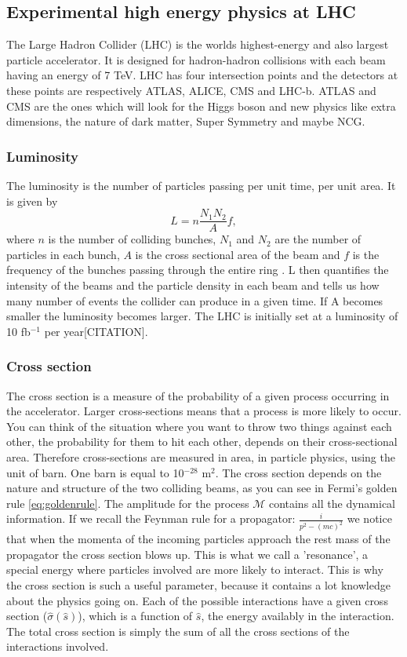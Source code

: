 \subsection{Experimental high energy physics at LHC}
The Large Hadron Collider (LHC) is the worlds highest-energy and also largest particle accelerator. It is designed for hadron-hadron collisions with each beam having an energy of 7 TeV. LHC has four intersection points and the detectors at these points are respectively ATLAS, ALICE, CMS and LHC-b. ATLAS and CMS are the ones which will look for the Higgs boson and new physics like extra dimensions, the nature of dark matter, Super Symmetry and maybe NCG. 

\subsubsection{Luminosity}
The luminosity is the number of particles passing per unit time, per unit area. It is given by
\begin{equation}
L=n\frac{N_{1}N_{2}}{A}f,
\end{equation}
where $n$ is the number of colliding bunches, $N_{1}$ and $N_{2}$ are the number of particles in each bunch, $A$ is the cross sectional area of the beam and $f$ is the frequency of the bunches passing through the entire ring \cite{martin1998pp}. L then quantifies the intensity of the beams and the particle density in each beam and tells us how many number of events the collider can produce in a given time. If A becomes smaller the luminosity becomes larger. The LHC is initially set at a luminosity of 10 fb$^{-1}$ per year[CITATION].

\subsubsection{Cross section}
The cross section is a measure of the probability of a given process occurring in the accelerator. Larger cross-sections means that a process is more likely to occur. You can think of the situation where you want to throw two things against each other, the probability for them to hit each other, depends on their cross-sectional area. Therefore cross-sections are measured in area, in particle physics, using the unit of barn. One barn is equal to 10$^{-28}$ m$^{2}$.
The cross section depends on the nature and structure of the two colliding beams, as you can see in Fermi's golden rule \eqref{eq:goldenrule}. The amplitude for the process $\mathcal{M}$ contains all the dynamical information. If we recall the Feynman rule for a propagator: $\frac{i}{p^{2}-(mc)^{2}}$ we notice that when the momenta of the incoming particles approach the rest mass of the propagator the cross section blows up. This is what we call a 'resonance', a special energy where particles involved are more likely to interact. This is why the cross section is such a useful parameter, because it contains a lot knowledge about the physics going on. Each of the possible interactions have a given cross section ($\hat \sigma(\hat s)$), which is a function of $\hat s$, the energy availably in the interaction. The total cross section is simply the sum of all the cross sections of the interactions involved\cite{griffiths1987iep}.

